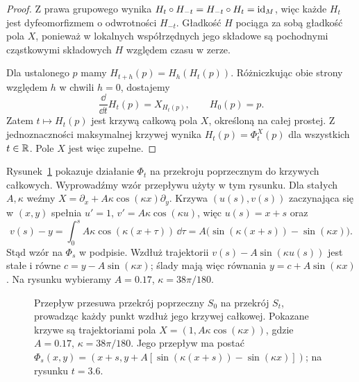 \begin{proof}
Z prawa grupowego wynika
$H_t\circ H_{-t}=H_{-t}\circ H_t=\mathrm{id}_M$, więc każde $H_t$
jest dyfeomorfizmem o odwrotności $H_{-t}$.
Gładkość $H$ pociąga za sobą gładkość pola $X$,
ponieważ w lokalnych współrzędnych jego składowe są pochodnymi
cząstkowymi składowych $H$ względem czasu w zerze.

Dla ustalonego $p$ mamy $H_{t+h}(p)=H_h(H_t(p))$.
Różniczkując obie strony względem $h$ w chwili $h=0$,
dostajemy
\[
\frac{\dd}{\dd t}H_t(p)=X_{H_t(p)},\qquad H_0(p)=p.
\]
Zatem $t\mapsto H_t(p)$ jest krzywą całkową pola $X$,
określoną na całej prostej. Z jednoznaczności maksymalnej krzywej
wynika $H_t(p)=\Phi_t^X(p)$ dla wszystkich $t\in\mathbb{R}$.
Pole $X$ jest więc zupełne.
\end{proof}

Rysunek~\ref{fig:przeplyw-przekroj} pokazuje działanie $\Phi_t$
na przekroju poprzecznym do krzywych całkowych.
Wyprowadźmy wzór przepływu użyty w tym rysunku.
Dla stałych $A,\kappa$ weźmy
$X=\partial_x+A\kappa\cos(\kappa x)\partial_y$.
Krzywa $(u(s),v(s))$ zaczynająca się w $(x,y)$ spełnia
$u'=1$, $v'=A\kappa\cos(\kappa u)$, więc $u(s)=x+s$ oraz
\[
 v(s)-y
 =\int_0^s A\kappa\cos(\kappa(x+\tau))\,\dd\tau
 =A\bigl(\sin(\kappa(x+s))-\sin(\kappa x)\bigr).
\]
Stąd wzór na $\Phi_s$ w podpisie.
Wzdłuż trajektorii $v(s)-A\sin(\kappa u(s))$
jest stałe i równe $c=y-A\sin(\kappa x)$;
ślady mają więc równania $y=c+A\sin(\kappa x)$.
Na rysunku wybieramy $A=0.17$, $\kappa=38\pi/180$.
\begin{figure}[H]
\centering
{}

\caption{Przepływ przesuwa przekrój poprzeczny $S_0$
na przekrój $S_t$, prowadząc każdy punkt wzdłuż jego krzywej
całkowej. Pokazane krzywe są trajektoriami pola
$X=(1,A\kappa\cos(\kappa x))$, gdzie $A=0.17$,
$\kappa=38\pi/180$. Jego przepływ ma postać
$\Phi_s(x,y)=(x+s,y+A[\sin(\kappa(x+s))-\sin(\kappa x)])$;
na rysunku $t=3.6$.}
\label{fig:przeplyw-przekroj}
\end{figure}

